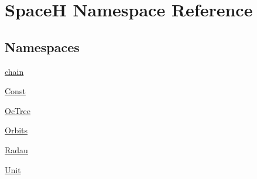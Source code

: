 \hypertarget{namespace_space_h}{}\section{SpaceH Namespace Reference}
\label{namespace_space_h}
\subsection*{Namespaces}
\begin{DoxyCompactItemize}
\item 
 \mbox{\hyperlink{namespace_space_h_1_1chain}{chain}}
\item 
 \mbox{\hyperlink{namespace_space_h_1_1_const}{Const}}
\item 
 \mbox{\hyperlink{namespace_space_h_1_1_oc_tree}{Oc\+Tree}}
\item 
 \mbox{\hyperlink{namespace_space_h_1_1_orbits}{Orbits}}
\item 
 \mbox{\hyperlink{namespace_space_h_1_1_radau}{Radau}}
\item 
 \mbox{\hyperlink{namespace_space_h_1_1_unit}{Unit}}
\end{DoxyCompactItemize}
